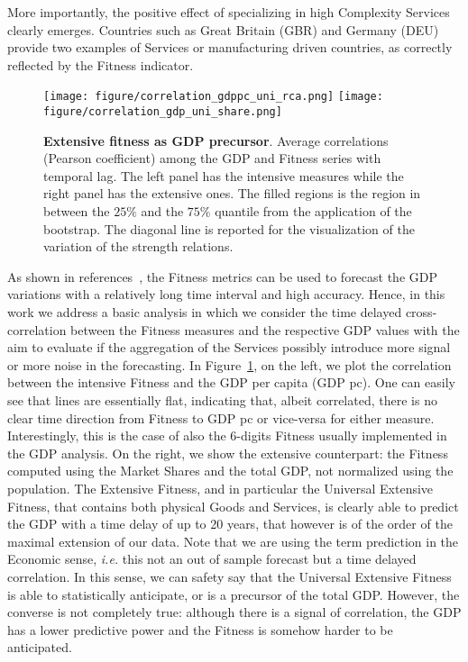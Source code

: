 \documentclass[fleqn,10pt]{article}
\begin{document}
More importantly, the positive effect of specializing in high Complexity Services clearly emerges. 
Countries such as Great Britain (GBR) and Germany (DEU) provide two examples of Services or manufacturing driven countries, as correctly reflected by the Fitness indicator.
\begin{figure}[!h]
	\centering
	\texttt{[image: figure/correlation\_gdppc\_uni\_rca.png]}
	\texttt{[image: figure/correlation\_gdp\_uni\_share.png]}
	\caption{\textbf{Extensive fitness as GDP precursor}. Average correlations (Pearson coefficient) among the GDP and Fitness series with temporal lag. The left panel has the intensive measures while the right panel has the extensive ones. The filled regions is the region in between the $25\%$ and the $75\%$ quantile from the application of the bootstrap. The diagonal line is reported for the visualization of the variation of the strength relations.}
	\label{fig:correlation}
\end{figure}
As shown in references~\cite{Tacchella2018,Cristelli2017}, the Fitness metrics can be used to forecast the GDP variations with a relatively long time interval and high accuracy.
Hence, in this work we address a basic analysis in which we consider the time delayed cross-correlation between the Fitness measures and the respective GDP values with the aim to evaluate if the aggregation of the Services possibly introduce more signal or more noise in the forecasting.
In Figure~\ref{fig:correlation}, on the left, we plot the correlation between the intensive Fitness and the GDP per capita (GDP pc). 
One can easily see that lines are essentially flat, indicating that, albeit correlated, there is no clear time direction from Fitness to GDP pc or vice-versa for either measure.
Interestingly, this is the case of also the 6-digits Fitness usually implemented in the GDP analysis.
On the right, we show the extensive counterpart: the Fitness computed using the Market Shares and the total GDP, not normalized using the population.
The Extensive Fitness, and in particular the Universal Extensive Fitness, that contains both physical Goods and Services, is clearly able to predict the GDP with a time delay of up to 20 years, that however is of the order of the maximal extension of our data. 
Note that we are using the term prediction in the Economic sense, \textit{i.e.} this not an out of sample forecast but a time delayed correlation. 
In this sense, we can safety say that the Universal Extensive Fitness is able to statistically anticipate, or is a precursor of the total GDP. 
However, the converse is not completely true: although there is a signal of correlation, the GDP has a lower predictive power and the Fitness is somehow harder to be anticipated.\\ 
\end{document}
